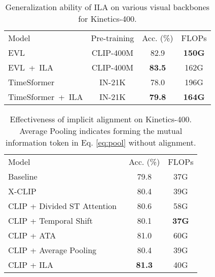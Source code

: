 \documentclass[10pt,twocolumn,letterpaper]{article}
\begin{document}
\begin{table}[h!]\small
\caption{Generalization ability of ILA on various visual backbones for Kinetics-400.
}
\vspace{-0.1in}
\begin{center}
\renewcommand\arraystretch{1.2}
\begin{tabular}{lccc}
\toprule
Model           & Pre-training & Acc. (\%)      & FLOPs         \\ 
\cmidrule(lr){1-1} \cmidrule(lr){2-2} \cmidrule(lr){3-4} \cmidrule(lr){4-4}
EVL~\cite{b25}             & CLIP-400M    & 82.9          & \textbf{150G} \\
EVL~+~ILA         & CLIP-400M    & \textbf{83.5} & 162G          \\ 
\cmidrule(lr){1-1} \cmidrule(lr){2-2} \cmidrule(lr){3-4} \cmidrule(lr){4-4}
TimeSformer~\cite{b13}     & IN-21K       & 78.0          & 196G          \\
TimeSformer~+~ILA & IN-21K       & \textbf{79.8} & \textbf{164G} \\ \bottomrule
\end{tabular}
\end{center}
\label{table:3}
\vspace{-0.1in}
\end{table}



\begin{table}[t!]\small
\caption{Effectiveness of implicit alignment on Kinetics-400. Average Pooling indicates forming the mutual information token in Eq. \eqref{eq:pool} without alignment.}
\vspace{-0.1in}
\begin{center}
\renewcommand\arraystretch{1.2}
\begin{tabular}{lcc}
\toprule
Model                   & Acc. (\%)      & FLOPs        \\ 
\cmidrule(lr){1-1} \cmidrule(lr){2-2} \cmidrule(lr){3-3}
Baseline                    & 79.8          & 37G          \\
X-CLIP~\cite{b24}                  & 80.4          & 39G          \\
CLIP + Divided ST Attention~\cite{b13} & 80.6          & 58G          \\
CLIP + Temporal Shift~\cite{b22}     & 80.1          & \textbf{37G} \\
CLIP + ATA~\cite{b28}                & 81.0          & 60G          \\
CLIP + Average Pooling          & 80.4          & 39G          \\ 
CLIP + ILA                & \textbf{81.3} & 40G          \\ \bottomrule
\end{tabular}
\end{center}
\label{table:4}
\vspace{-0.2in}
\end{table}
\end{document}
